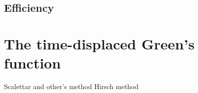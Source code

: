 \documentclass[%
 reprint,
superscriptaddress,
showpacs,
 amsmath,amssymb,
 aps,
 prb,
longbibliography,
]{revtex4-1}
\begin{document}



\subsection{Efficiency}



\section{The time-displaced Green's function}
Scalettar and other's method \cite{Loh2005}
Hirsch method\cite{Hirsch1988}








\clearpage

\end{document}
